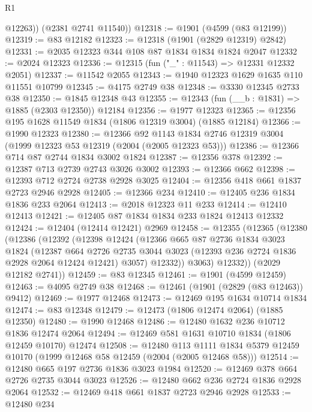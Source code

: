 \begin{lexlean}{R1}
\begin{coremodule}
          @12263))
      (@2381 @2741 @11540))
@12318 := @1901 (@4599 (@83 @12199))
@12319 := @83 @12182
@12323 := @12318 (@1901 (@2829 @12319) @2842)
@12331 := @2035 @12323 @344 @108 @87 @1834 @1834 @1824 @2047
@12332 := @2024 @12323
@12336 := @12315 (fun ("_" : @11543) => @12331 @12332 @2051)
@12337 := @11542 @2055
@12343 := @1940 @12323 @1629 @1635 @110 @11551 @10799
@12345 := @4175 @2749 @38
@12348 := @3330 @12345 @2733 @38
@12350 := @1845 @12348 @43
@12355 := @12343 (fun (__b : @1831) => @1885 (@2303 @12350)) @12184
@12356 := @1977 @12323
@12365 := @12356 @195 @1628 @11549 @1834 (@1806 @12319 @3004) (@1885 @12184)
@12366 := @1990 @12323
@12380 := @12366
    @92
    @1143
    @1834
    @2746
    @12319
    @3004
    (@1999 @12323 @53 @12319 (@2004 (@2005 @12323 @53)))
@12386 := @12366 @714 @87 @2744 @1834 @3002 @1824
@12387 := @12356 @378
@12392 := @12387 @713 @2739 @2743 @3026 @3002
@12393 := @12366 @662
@12398 := @12393 @712 @2724 @2738 @2928 @3025
@12404 := @12356 @418 @661 @1837 @2723 @2946 @2928
@12405 := @12366 @234
@12410 := @12405 @236 @1834 @1836 @233 @2064
@12413 := @2018 @12323 @11 @233
@12414 := @12410 @12413
@12421 := @12405 @87 @1834 @1834 @233 @1824 @12413 @12332
@12424 := @12404 (@12414 @12421) @2969
@12458 := @12355
    (@12365
      (@12380
        (@12386
          (@12392
            (@12398
              @12424
              (@12366
                @665
                @87
                @2736
                @1834
                @3023
                @1824
                (@12387
                  @664
                  @2726
                  @2735
                  @3044
                  @3023
                  (@12393 @236 @2724 @1836 @2928 @2064 @12424 @12421)
                  @3057)
                @12332))
            @3063)
          @12332))
      (@2029 @12182 @2741))
@12459 := @83 @12345
@12461 := @1901 (@4599 @12459)
@12463 := @4095 @2749 @38
@12468 := @12461 (@1901 (@2829 (@83 @12463)) @9412)
@12469 := @1977 @12468
@12473 := @12469 @195 @1634 @10714 @1834
@12474 := @83 @12348
@12479 := @12473 (@1806 @12474 @2064) (@1885 @12350)
@12480 := @1990 @12468
@12486 := @12480 @1632 @236 @10712 @1836 @12474 @2064
@12494 := @12469 @581 @1631 @10710 @1834 (@1806 @12459 @10170) @12474
@12508 := @12480
    @113
    @1111
    @1834
    @5379
    @12459
    @10170
    (@1999 @12468 @58 @12459 (@2004 (@2005 @12468 @58)))
@12514 := @12480 @665 @197 @2736 @1836 @3023 @1984
@12520 := @12469 @378 @664 @2726 @2735 @3044 @3023
@12526 := @12480 @662 @236 @2724 @1836 @2928 @2064
@12532 := @12469 @418 @661 @1837 @2723 @2946 @2928
@12533 := @12480 @234

\end{coremodule}
\end{lexlean}
